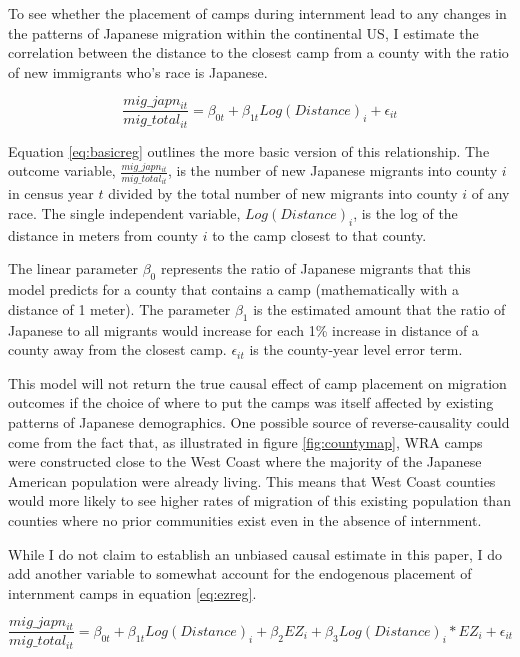 \documentclass[12pt]{article}
\begin{document}
To see whether the placement of camps during internment lead to any changes in the patterns of Japanese migration within the continental US, I estimate the correlation between the distance to the closest camp from a county with the ratio of new immigrants who's race is Japanese. 

\begin{equation}\label{eq:basicreg}
    \frac{mig\_japn_{it}}{mig\_total_{it}} = \beta_{0t} + \beta_{1t} Log(Distance)_i  +  \epsilon_{it}
\end{equation}


Equation \ref{eq:basicreg} outlines the more basic version of this relationship. 
The outcome variable, $\frac{mig\_japn_{it}}{mig\_total_{it}}$, is the number of new Japanese migrants into county $i$ in census year $t$ divided by the total number of new migrants into county $i$ of any race.
The single independent variable, $Log(Distance)_i$, is the log of the distance in meters from county $i$ to the camp closest to that county.

The linear parameter $\beta_0$ represents the ratio of Japanese migrants that this model predicts for a county that contains a camp (mathematically with a distance of 1 meter).
The parameter $\beta_1$ is the estimated amount that the ratio of Japanese to all migrants would increase for each 1\% increase in distance of a county away from the closest camp.
$\epsilon_{it}$ is the county-year level error term.

This model will not return the true causal effect of camp placement on migration outcomes if the choice of where to put the camps was itself affected by existing patterns of Japanese demographics.
One possible source of reverse-causality could come from the fact that, as illustrated in figure \ref{fig:countymap},
WRA camps were constructed close to the West Coast where the majority of the Japanese American population were already living. 
This means that West Coast counties would more likely to see higher rates of migration of this existing population than counties where no prior communities exist even in the absence of internment. 

While I do not claim to establish an unbiased causal estimate in this paper, 
I do add another variable to somewhat account for the endogenous placement of internment camps in equation \ref{eq:ezreg}.

\begin{equation}\label{eq:ezreg}
    \frac{mig\_japn_{it}}{mig\_total_{it}} = \beta_{0t} + \beta_{1t} Log(Distance)_i + \beta_2 EZ_i + \beta_3 Log(Distance)_i * EZ_i +  \epsilon_{it}
\end{equation}
\end{document}
